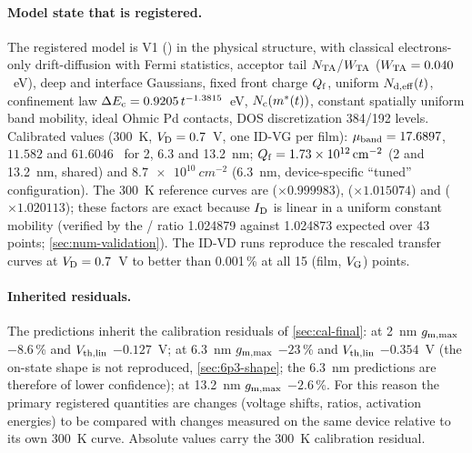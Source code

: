 \paragraph{Model state that is registered.} The registered model is V1 () in the physical structure, with classical electrons-only drift-diffusion with Fermi statistics, acceptor tail $N_{\mathrm{TA}}$/$W_{\mathrm{TA}}$ ($W_{\mathrm{TA}} = 0.040$~eV), deep and interface Gaussians, fixed front charge $Q_{\mathrm{f}}$, uniform $N_{\mathrm{d,eff}}(t)$, confinement law $\Delta E_{\mathrm{c}} = 0.9205\,t^{-1.3815}$~eV, $N_{\mathrm{c}}(m^{*}(t))$, constant spatially uniform band mobility, ideal Ohmic Pd contacts, DOS discretization 384/192 levels. Calibrated values (300~K, $V_{\mathrm{D}} = 0.7$~V, one ID-VG per film): $\mu_{\mathrm{band}} = 17.6897$, $11.582$ and $61.6046$~\cmVs{} for 2, 6.3 and 13.2~nm; $Q_{\mathrm{f}} = \SI{1.73e12}{cm^{-2}}$ (2 and 13.2~nm, shared) and $\SI{8.7e10}{cm^{-2}}$ (6.3~nm, device-specific ``tuned'' configuration). The 300~K reference curves are  ($\times 0.999983$),  ($\times 1.015074$) and  ($\times 1.020113$); these factors are exact because $I_{\mathrm{D}}$ is linear in a uniform constant mobility (verified by the / ratio 1.024879 against 1.024873 expected over 43 points; \cref{sec:num-validation}). The ID-VD runs reproduce the rescaled transfer curves at $V_{\mathrm{D}} = 0.7$~V to better than 0.001\,\% at all 15 (film, $V_{\mathrm{G}}$) points.

\paragraph{Inherited residuals.} The predictions inherit the calibration residuals of \cref{sec:cal-final}: at 2~nm $g_{\mathrm{m,max}}$ $-8.6$\,\% and $V_{\mathrm{th,lin}}$ $-0.127$~V; at 6.3~nm $g_{\mathrm{m,max}}$ $-23$\,\% and $V_{\mathrm{th,lin}}$ $-0.354$~V (the on-state shape is not reproduced, \cref{sec:6p3-shape}; the 6.3~nm predictions are therefore of lower confidence); at 13.2~nm $g_{\mathrm{m,max}}$ $-2.6$\,\%. For this reason the primary registered quantities are changes (voltage shifts, ratios, activation energies) to be compared with changes measured on the same device relative to its own 300~K curve. Absolute values carry the 300~K calibration residual.

